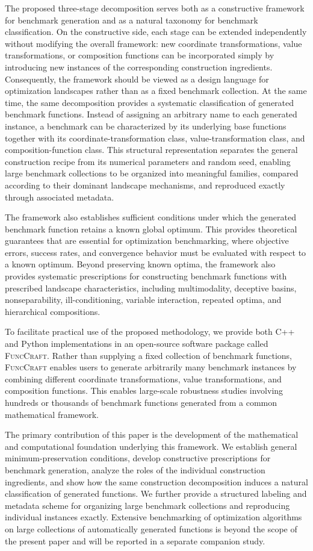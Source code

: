 \documentclass[11pt,a4paper]{article}
\theoremstyle{remark}
\theoremstyle{plain}
\begin{document}
The proposed three-stage decomposition serves both as a constructive framework
for benchmark generation and as a natural taxonomy for benchmark
classification. On the constructive side, each stage can be extended
independently without modifying the overall framework: new coordinate
transformations, value transformations, or composition functions can be
incorporated simply by introducing new instances of the corresponding
construction ingredients. Consequently, the framework should be viewed as a design language
for optimization landscapes rather than as a fixed benchmark collection. At
the same time, the same decomposition provides a systematic classification of
generated benchmark functions. Instead of assigning an arbitrary name to each
generated instance, a benchmark can be characterized by its underlying base
functions together with its coordinate-transformation class,
value-transformation class, and composition-function class. This structural
representation separates the general construction recipe from its numerical
parameters and random seed, enabling large benchmark collections to be
organized into meaningful families, compared according to their dominant
landscape mechanisms, and reproduced exactly through associated metadata.


The framework also establishes sufficient conditions under which the generated
benchmark function retains a known global optimum. This provides theoretical
guarantees that are essential for optimization benchmarking, where objective
errors, success rates, and convergence behavior must be evaluated with respect
to a known optimum. Beyond preserving known optima, the framework also provides
systematic prescriptions for constructing benchmark functions with prescribed
landscape characteristics, including multimodality, deceptive basins,
nonseparability, ill-conditioning, variable interaction, repeated optima, and
hierarchical compositions.

To facilitate practical use of the proposed methodology, we provide both C++
and Python implementations in an open-source software package called
\textsc{FuncCraft}. Rather than supplying a fixed collection of benchmark
functions, \textsc{FuncCraft} enables users to generate arbitrarily many
benchmark instances by combining different coordinate transformations, value
transformations, and composition functions. This enables large-scale robustness
studies involving hundreds or thousands of benchmark functions generated from a
common mathematical framework.

The primary contribution of this paper is the development of the mathematical
and computational foundation underlying this framework. We establish general
minimum-preservation conditions, develop constructive prescriptions for
benchmark generation, analyze the roles of the individual construction
ingredients, and show how the same construction decomposition induces a natural
classification of generated functions. We further provide a structured labeling and metadata
scheme for organizing large benchmark collections and reproducing individual
instances exactly. Extensive benchmarking of optimization algorithms on large
collections of automatically generated functions is beyond the scope of the
present paper and will be reported in a separate companion study.
\end{document}
